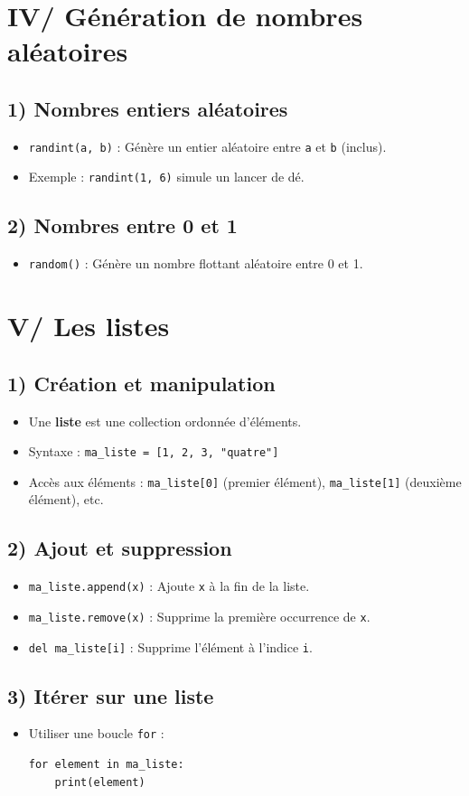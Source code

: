 \documentclass[11pt,a4paper]{article}
\begin{document}
\section*{IV/ Génération de nombres aléatoires}
\subsection*{1) Nombres entiers aléatoires}
\begin{itemize}[leftmargin=*]
    \item \lstinline|randint(a, b)| : Génère un entier aléatoire entre \texttt{a} et \texttt{b} (inclus).
    \item Exemple : \lstinline|randint(1, 6)| simule un lancer de dé.
\end{itemize}

\subsection*{2) Nombres entre 0 et 1}
\begin{itemize}[leftmargin=*]
    \item \lstinline|random()| : Génère un nombre flottant aléatoire entre 0 et 1.
\end{itemize}

\section*{V/ Les listes}
\subsection*{1) Création et manipulation}
\begin{itemize}[leftmargin=*]
    \item Une \textbf{liste} est une collection ordonnée d'éléments.
    \item Syntaxe : \lstinline|ma_liste = [1, 2, 3, "quatre"]|
    \item Accès aux éléments : \lstinline|ma_liste[0]| (premier élément), 
    \lstinline|ma_liste[1]| (deuxième élément), etc.
\end{itemize}

\subsection*{2) Ajout et suppression}
\begin{itemize}[leftmargin=*]
    \item \lstinline|ma_liste.append(x)| : Ajoute \texttt{x} à la fin de la liste.
    \item \lstinline|ma_liste.remove(x)| : Supprime la première occurrence de \texttt{x}.
    \item \lstinline|del ma_liste[i]| : Supprime l'élément à l'indice \texttt{i}.
\end{itemize}

\subsection*{3) Itérer sur une liste}
\begin{itemize}[leftmargin=*]
    \item Utiliser une boucle \texttt{for} :
    \begin{lstlisting}
for element in ma_liste:
    print(element)
    \end{lstlisting}
\end{itemize}
\end{document}
